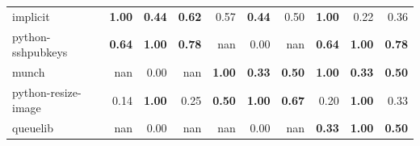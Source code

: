 \documentclass[submit,noauthor,dvipdfmx]{ipsj}
\begin{document}
\begin{table}{}
{\begin{tabular}{l||p{4em}|p{4em}|p{4em}||p{4em}|p{4em}|p{4em}||p{4em}|p{4em}|p{4em}}
            \hline \hline
            implicit & \multicolumn{1}{r|}{\textbf{1.00}} & \multicolumn{1}{r|}{\textbf{0.44}} & \multicolumn{1}{r||}{\textbf{0.62}} & \multicolumn{1}{r|}{0.57} & \multicolumn{1}{r|}{\textbf{0.44}} & \multicolumn{1}{r||}{0.50} & \multicolumn{1}{r|}{\textbf{1.00}} & \multicolumn{1}{r|}{0.22} & \multicolumn{1}{r}{0.36} \\
            python-sshpubkeys & \multicolumn{1}{r|}{\textbf{0.64}} & \multicolumn{1}{r|}{\textbf{1.00}} & \multicolumn{1}{r||}{\textbf{0.78}} & \multicolumn{1}{r|}{nan} & \multicolumn{1}{r|}{0.00} & \multicolumn{1}{r||}{nan} & \multicolumn{1}{r|}{\textbf{0.64}} & \multicolumn{1}{r|}{\textbf{1.00}} & \multicolumn{1}{r}{\textbf{0.78}} \\
            munch & \multicolumn{1}{r|}{nan} & \multicolumn{1}{r|}{0.00} & \multicolumn{1}{r||}{nan} & \multicolumn{1}{r|}{\textbf{1.00}} & \multicolumn{1}{r|}{\textbf{0.33}} & \multicolumn{1}{r||}{\textbf{0.50}} & \multicolumn{1}{r|}{\textbf{1.00}} & \multicolumn{1}{r|}{\textbf{0.33}} & \multicolumn{1}{r}{\textbf{0.50}} \\
            python-resize-image & \multicolumn{1}{r|}{0.14} & \multicolumn{1}{r|}{\textbf{1.00}} & \multicolumn{1}{r||}{0.25} & \multicolumn{1}{r|}{\textbf{0.50}} & \multicolumn{1}{r|}{\textbf{1.00}} & \multicolumn{1}{r||}{\textbf{0.67}} & \multicolumn{1}{r|}{0.20} & \multicolumn{1}{r|}{\textbf{1.00}} &\multicolumn{1}{r}{0.33} \\
            queuelib & \multicolumn{1}{r|}{nan} & \multicolumn{1}{r|}{0.00} & \multicolumn{1}{r||}{nan} & \multicolumn{1}{r|}{nan} & \multicolumn{1}{r|}{0.00} & \multicolumn{1}{r||}{nan} & \multicolumn{1}{r|}{\textbf{0.33}} & \multicolumn{1}{r|}{\textbf{1.00}} & \multicolumn{1}{r}{\textbf{0.50}} \\ \hline
        \end{tabular}
    }
\end{table}
\end{document}
